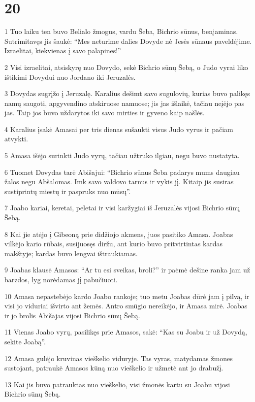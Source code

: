 \chapter{20}


\par 1 Tuo laiku ten buvo Belialo žmogus, vardu Šeba, Bichrio sūnus, benjaminas. Sutrimitavęs jis šaukė: “Mes neturime dalies Dovyde nė Jesės sūnaus paveldėjime. Izraelitai, kiekvienas į savo palapines!” 
\par 2 Visi izraelitai, atsiskyrę nuo Dovydo, sekė Bichrio sūnų Šebą, o Judo vyrai liko ištikimi Dovydui nuo Jordano iki Jeruzalės. 
\par 3 Dovydas sugrįžo į Jeruzalę. Karalius dešimt savo sugulovių, kurias buvo palikęs namų saugoti, apgyvendino atskiruose namuose; jis jas išlaikė, tačiau neįėjo pas jas. Taip jos buvo uždarytos iki savo mirties ir gyveno kaip našlės. 
\par 4 Karalius įsakė Amasai per tris dienas sušaukti visus Judo vyrus ir pačiam atvykti. 
\par 5 Amasa išėjo surinkti Judo vyrų, tačiau užtruko ilgiau, negu buvo nustatyta. 
\par 6 Tuomet Dovydas tarė Abišajui: “Bichrio sūnus Šeba padarys mums daugiau žalos negu Abšalomas. Imk savo valdovo tarnus ir vykis jį. Kitaip jis susiras sustiprintų miestų ir paspruks nuo mūsų”. 
\par 7 Joabo kariai, keretai, peletai ir visi karžygiai iš Jeruzalės vijosi Bichrio sūnų Šebą. 
\par 8 Kai jie atėjo į Gibeoną prie didžiojo akmens, juos pasitiko Amasa. Joabas vilkėjo kario rūbais, susijuosęs diržu, ant kurio buvo pritvirtintas kardas makštyje; kardas buvo lengvai ištraukiamas. 
\par 9 Joabas klausė Amasos: “Ar tu esi sveikas, broli?” ir paėmė dešine ranka jam už barzdos, lyg norėdamas jį pabučiuoti. 
\par 10 Amasa nepastebėjo kardo Joabo rankoje; tuo metu Joabas dūrė jam į pilvą, ir visi jo viduriai išvirto ant žemės. Antro smūgio nereikėjo, ir Amasa mirė. Joabas ir jo brolis Abišajas vijosi Bichrio sūnų Šebą. 
\par 11 Vienas Joabo vyrų, pasilikęs prie Amasos, sakė: “Kas su Joabu ir už Dovydą, sekite Joabą”. 
\par 12 Amasa gulėjo kruvinas vieškelio viduryje. Tas vyras, matydamas žmones sustojant, patraukė Amasos kūną nuo vieškelio ir užmetė ant jo drabužį. 
\par 13 Kai jis buvo patrauktas nuo vieškelio, visi žmonės kartu su Joabu vijosi Bichrio sūnų Šebą. 

